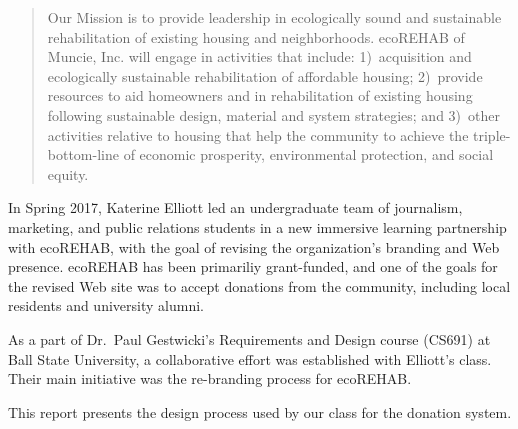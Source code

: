 \documentclass[letter]{article}
\begin{document}
\begin{quote}
  Our Mission is to provide leadership in ecologically sound and
  sustainable rehabilitation of existing housing and
  neighborhoods. ecoREHAB of Muncie, Inc. will engage in activities
  that include: 1)~acquisition and ecologically sustainable
  rehabilitation of affordable housing; 2)~provide resources to aid
  homeowners and in rehabilitation of existing housing following
  sustainable design, material and system strategies; and 3)~other
  activities relative to housing that help the community to achieve
  the triple-bottom-line of economic prosperity, environmental
  protection, and social equity.
\end{quote}

In Spring 2017, Katerine Elliott led an undergraduate team of journalism,
marketing, and public relations students in a new immersive learning
partnership with ecoREHAB, with the goal of revising the organization's
branding and Web presence.
ecoREHAB has been primariliy grant-funded, and one of the 
goals for the revised Web site was to accept donations from
the community, including local residents and university alumni.

As a part of Dr.\ Paul Gestwicki's Requirements and Design course (CS691)
at Ball State University, a collaborative effort was established with
Elliott's class. Their main initiative was the re-branding process for
ecoREHAB.

This report presents the design process used by our class for the
donation system.
\end{document}
